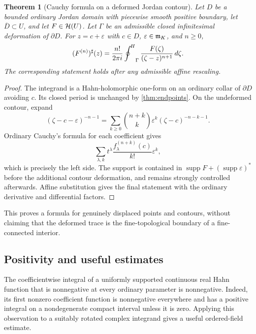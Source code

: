 \documentclass[11pt,letterpaper]{article}
\newtheorem{theorem}{Theorem}[section]
\theoremstyle{definition}
\theoremstyle{remark}
\newcommand{\supp}{\operatorname{supp}}\newcommand{\red}{\operatorname{red}}\newcommand{\st}{\operatorname{st}}
\numberwithin{equation}{section}
\begin{document}
\begin{theorem}[Cauchy formula on a deformed Jordan contour]\label{thm:cauchyformula}
Let $D$ be a bounded ordinary Jordan domain with piecewise smooth positive boundary, let $\overline D\subset U$, and let $F\in\mathcal H(U)$. Let $\Gamma$ be an admissible closed infinitesimal deformation of $\partial D$. For $z=c+\varepsilon$ with $c\in D$, $\varepsilon\in\mathfrak m_K$, and $n\ge0$,
\begin{equation}\label{eq:cauchyformula}
 (F^{(n)})^{\sharp}(z)=\frac{n!}{2\pi i}\mathop{\oint^{\!H}}\nolimits_\Gamma
                 \frac{F(\zeta)}{(\zeta-z)^{n+1}}\,d\zeta.
\end{equation}
The corresponding statement holds after any admissible affine rescaling.
\end{theorem}
\begin{proof}
The integrand is a Hahn-holomorphic one-form on an ordinary collar of $\partial D$ avoiding $c$. Its closed period is unchanged by \cref{thm:endpoints}. On the undeformed contour, expand
\[
 (\zeta-c-\varepsilon)^{-n-1}
 =\sum_{k\ge0}\binom{n+k}{k}
       \varepsilon^k(\zeta-c)^{-n-k-1}.
\]
Ordinary Cauchy's formula for each coefficient gives
\[
 \sum_{\lambda,k}t^\lambda
      \frac{f_\lambda^{(n+k)}(c)}{k!}\varepsilon^k,
\]
which is precisely the left side. The support is contained in
$\supp F+(\supp\varepsilon)^*$ before the additional contour deformation, and remains strongly controlled afterwards. Affine substitution gives the final statement with the ordinary derivative and differential factors.
\end{proof}

This proves a formula for genuinely displaced points and contours, without claiming that the deformed trace is the fine-topological boundary of a fine-connected interior.

\subsection{Positivity and useful estimates}
The coefficientwise integral of a uniformly supported continuous real Hahn function that is nonnegative at every ordinary parameter is nonnegative. Indeed, its first nonzero coefficient function is nonnegative everywhere and has a positive integral on a nondegenerate compact interval unless it is zero. Applying this observation to a suitably rotated complex integrand gives a useful ordered-field estimate.
\end{document}
